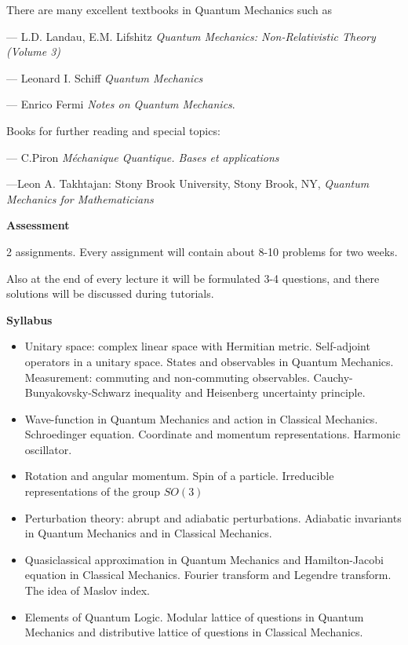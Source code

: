 \documentclass[12pt]{article}
\begin{document}
There are many excellent textbooks in Quantum Mechanics such as
  

 --- L.D. Landau, E.M. Lifshitz   {\it Quantum Mechanics: 
     Non-Relativistic Theory (Volume 3)}


\smallskip

  --- Leonard I. Schiff {\it Quantum Mechanics}

\smallskip

   ---  Enrico Fermi {\it Notes on Quantum Mechanics}.



\medskip

Books for further reading and  special topics: 

   --- C.Piron {\it M\'echanique Quantique. 
        Bases et applications}

\medskip

    ---Leon A. Takhtajan: 
  Stony Brook University, Stony Brook, NY, 
{\it Quantum Mechanics for Mathematicians}

\bigskip



{\bf Assessment}


2 assignments. Every assignment will contain about
   8-10 problems for two weeks.

  Also at the end of every lecture it will be formulated
3-4 questions, and there solutions will be discussed during tutorials.

 

\medskip


{\bf Syllabus}

\begin{itemize}

 \item 
Unitary space: complex linear space with Hermitian metric.
Self-adjoint operators in a unitary space. 
States and observables in
Quantum Mechanics. Measurement: 
commuting and non-commuting observables.
Cauchy-Bunyakovsky-Schwarz inequality and Heisenberg uncertainty principle.
 
\item  Wave-function in Quantum Mechanics and action in Classical
Mechanics. Schroedinger equation. Coordinate and momentum
representations. Harmonic oscillator.
 	

\item Rotation and angular momentum. Spin of a particle.
    Irreducible representations of the group $SO(3)$


\item 
Perturbation theory: abrupt and adiabatic perturbations.
Adiabatic invariants in Quantum Mechanics and in Classical Mechanics.
 

\item Quasiclassical approximation in Quantum Mechanics and
Hamilton-Jacobi equation in Classical Mechanics. 
Fourier transform and
Legendre transform. The idea of Maslov index.
 	

\item Elements of Quantum Logic. Modular lattice of questions
in Quantum Mechanics and distributive lattice of
questions in  Classical Mechanics.

\end{itemize}
\end{document}
